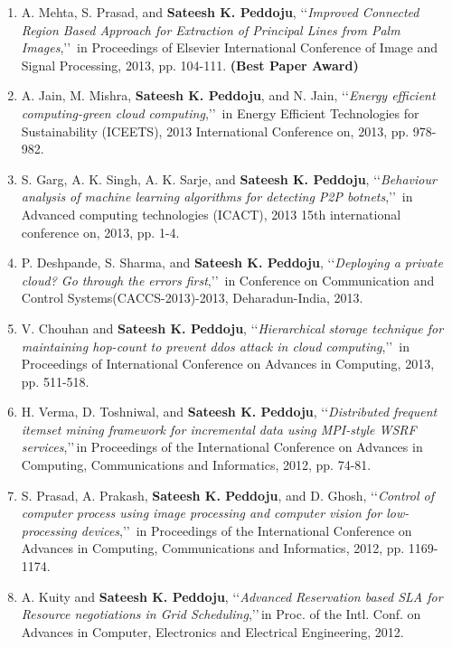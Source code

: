 \begin{enumerate}
	\item
	A. Mehta, S. Prasad, and  \textbf{Sateesh K. Peddoju}, \lq\lq \textit{Improved Connected Region Based Approach for Extraction of Principal Lines from Palm Images},\rq\rq\, in Proceedings of Elsevier International Conference of Image and Signal Processing, 2013, pp. 104-111. \textbf{(Best Paper Award)}
	
	\item
	A. Jain, M. Mishra, \textbf{Sateesh K. Peddoju}, and N. Jain, \lq\lq \textit{Energy efficient computing-green cloud computing},\rq\rq\, in Energy Efficient Technologies for Sustainability (ICEETS), 2013 International Conference on, 2013, pp. 978-982.
	
	\item
	S. Garg, A. K. Singh, A. K. Sarje, and \textbf{Sateesh K. Peddoju}, \lq\lq \textit{Behaviour analysis of machine learning algorithms for detecting P2P botnets},\rq\rq\, in Advanced computing technologies (ICACT), 2013 15th international conference on, 2013, pp. 1-4.
	
	\item
	P. Deshpande, S. Sharma, and \textbf{Sateesh K. Peddoju}, \lq\lq \textit{Deploying a private cloud? Go through the errors first},\rq\rq\, in Conference on Communication and Control Systems(CACCS-2013)-2013, Deharadun-India, 2013.
	
	
	\item
	V. Chouhan and \textbf{Sateesh K. Peddoju}, \lq\lq \textit{Hierarchical storage technique for maintaining hop-count to prevent ddos attack in cloud computing},\rq\rq\, in Proceedings of International Conference on Advances in Computing, 2013, pp. 511-518.
	
	\item
	H. Verma, D. Toshniwal, and  \textbf{Sateesh K. Peddoju}, \lq\lq \textit{Distributed frequent itemset mining framework for incremental data using MPI-style WSRF services},\rq\rq\,in Proceedings of the International Conference on Advances in Computing, Communications and Informatics, 2012, pp. 74-81.
	
	\item
	S. Prasad, A. Prakash, \textbf{Sateesh K. Peddoju}, and D. Ghosh, \lq\lq \textit{Control of computer process using image processing and computer vision for low-processing devices},\rq\rq\, in Proceedings of the International Conference on Advances in Computing, Communications and Informatics, 2012, pp. 1169-1174.
	
	\item
	A. Kuity and \textbf{Sateesh K. Peddoju}, \lq\lq \textit{Advanced Reservation based SLA for Resource negotiations in Grid Scheduling},\rq\rq\,in Proc. of the Intl. Conf. on Advances in Computer, Electronics and Electrical Engineering, 2012.
	
	\end{enumerate}